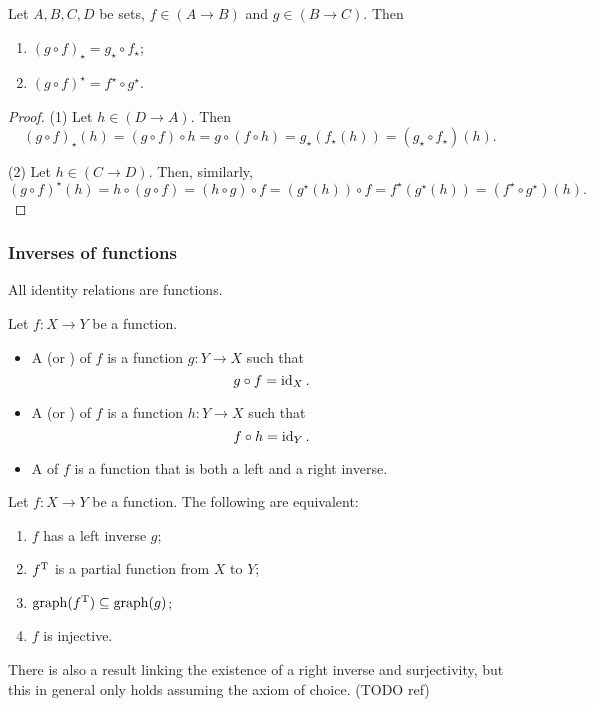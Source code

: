 \begin{lemma} \label{covarianceContravarianceComposition}
Let $A,B,C, D$ be sets, $f\in (A\to B)$ and $g\in(B\to C)$. Then
\begin{enumerate}
\item $(g\circ f)_\star = g_\star\circ f_\star$;
\item $(g\circ f)^\star = f^\star\circ g^\star$.
\end{enumerate}
\end{lemma}
\begin{proof}
(1) Let $h\in (D\to A)$. Then
\[(g\circ f)_\star(h) = (g\circ f)\circ h = g\circ(f\circ h) = g_\star(f_\star(h)) = (g_\star\circ f_\star)(h). \]

(2) Let $h\in (C\to D)$. Then, similarly, 
\[ (g\circ f)^\star(h) = h\circ (g\circ f) = (h\circ g)\circ f = (g^\star(h))\circ f = f^\star(g^\star(h)) = (f^\star\circ g^\star)(h). \]
\end{proof}

\subsubsection{Inverses of functions}
All identity relations are functions.

\begin{definition}
Let $f:X\to Y$ be a function.
\begin{itemize}
\item A  (or ) of $f$ is a function $g: Y\to X$ such that
\[ g\circ f = \operatorname{id}_X. \]
\item A  (or ) of $f$ is a function $h: Y\to X$ such that
\[ f\circ h = \operatorname{id}_Y. \]
\item A  of $f$ is a function that is both a left and a right inverse.
\end{itemize}
\end{definition}

\begin{lemma} \label{injectiveInverse}
Let $f:X\to Y$ be a function. The following are equivalent:
\begin{enumerate}
\item $f$ has a left inverse $g$;
\item $f^{\mathrm{T}}$ is a partial function from $X$ to $Y$; 
\item $\operatorname{graph}(f^{\mathrm{T}}) \subseteq \operatorname{graph}(g)$;
\item $f$ is injective.
\end{enumerate}
\end{lemma}
There is also a result linking the existence of a right inverse and surjectivity, but this in general only holds assuming the axiom of choice. (TODO ref)

